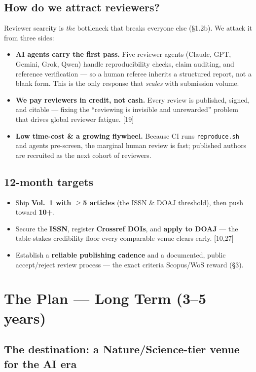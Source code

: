 \documentclass[11pt]{article}
\newcommand{\src}[1]{{\footnotesize\color{ink3}[#1]}}
\begin{document}
\subsection{How do we attract reviewers?}

Reviewer scarcity is \emph{the} bottleneck that breaks everyone else (\S1.2b). We attack it from three sides:
\begin{itemize}
\item \textbf{AI agents carry the first pass.} Five reviewer agents (Claude, GPT, Gemini, Grok, Qwen) handle reproducibility checks, claim auditing, and reference verification --- so a human referee inherits a structured report, not a blank form. This is the only response that \emph{scales} with submission volume.
\item \textbf{We pay reviewers in credit, not cash.} Every review is published, signed, and citable --- fixing the ``reviewing is invisible and unrewarded'' problem that drives global reviewer fatigue. \src{19}
\item \textbf{Low time-cost \& a growing flywheel.} Because CI runs \texttt{reproduce.sh} and agents pre-screen, the marginal human review is fast; published authors are recruited as the next cohort of reviewers.
\end{itemize}

\subsection{12-month targets}
\begin{itemize}
\item Ship \textbf{Vol.~1 with $\ge$5 articles} (the ISSN \& DOAJ threshold), then push toward \textbf{10+}.
\item Secure the \textbf{ISSN}, register \textbf{Crossref DOIs}, and \textbf{apply to DOAJ} --- the table-stakes credibility floor every comparable venue clears early. \src{10,27}
\item Establish a \textbf{reliable publishing cadence} and a documented, public accept/reject review process --- the exact criteria Scopus/WoS reward (\S3).
\end{itemize}

\section{The Plan --- Long Term (3--5 years)}

\subsection{The destination: a Nature/Science-tier venue for the AI era}
\end{document}

